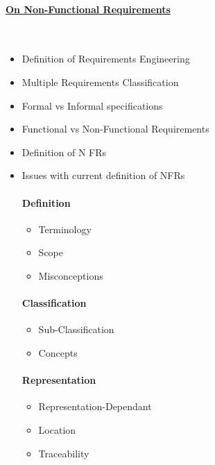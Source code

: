 \documentclass[dissertation]{softeng}
\begin{document}
\paragraph*{\underline{On Non-Functional Requirements}}~\cite{Glinz:2007ehba}
\begin{itemize}
\item Definition of Requirements Engineering
\item Multiple Requirements Classification
\item Formal vs Informal specifications
\item Functional vs Non-Functional Requirements
\item Definition of N FRs
\item Issues with current definition of NFRs
\paragraph{Definition}
\begin{itemize}
\item Terminology
\item Scope
\item Misconceptions
\end{itemize}
\paragraph{Classification}
\begin{itemize}
\item Sub-Classification
\item Concepts
\end{itemize}
\paragraph{Representation}
\begin{itemize}
\item Representation-Dependant
\item Location
\item Traceability
\end{itemize}
\end{itemize}
\pagebreak
\end{document}
